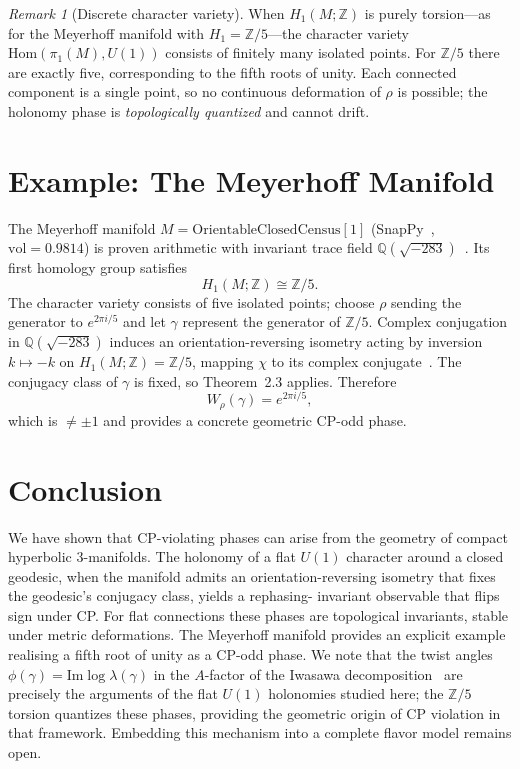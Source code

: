 \documentclass[12pt]{article}
\theoremstyle{remark}
\newtheorem{remark}[theorem]{Remark}
\theoremstyle{plain}
\begin{document}
\begin{remark}[Discrete character variety]
When $H_1(M;\mathbb{Z})$ is purely torsion---as for the Meyerhoff
manifold with $H_1=\mathbb{Z}/5$---the character variety
$\mathrm{Hom}(\pi_1(M),U(1))$ consists of finitely many isolated points.
For $\mathbb{Z}/5$ there are exactly five, corresponding to the fifth
roots of unity.  Each connected component is a single point, so no
continuous deformation of $\rho$ is possible; the holonomy phase is
\emph{topologically quantized} and cannot drift.
\end{remark}

\section{Example: The Meyerhoff Manifold}

The Meyerhoff manifold $M=\mathrm{OrientableClosedCensus}[1]$
(SnapPy~\cite{SnapPy}, $\mathrm{vol}=0.9814$) is proven arithmetic
with invariant trace field $\mathbb{Q}(\sqrt{-283})$~\cite{Chinburg98}.
Its first homology group satisfies
\[
H_1(M;\mathbb{Z}) \cong \mathbb{Z}/5.
\]
The character variety consists of five isolated points; choose $\rho$
sending the generator to $e^{2\pi i/5}$ and let $\gamma$ represent the
generator of $\mathbb{Z}/5$.
Complex conjugation in $\mathbb{Q}(\sqrt{-283})$ induces an
orientation-reversing isometry acting by inversion
$k\mapsto -k$ on $H_1(M;\mathbb{Z})=\mathbb{Z}/5$,
mapping $\chi$ to its complex conjugate~\cite{MaclachlanReid,Chinburg98}.
The conjugacy class of $\gamma$ is fixed, so Theorem~2.3 applies.
Therefore
\[
W_\rho(\gamma) = e^{2\pi i/5},
\]
which is $\neq \pm 1$ and provides a concrete geometric CP-odd phase.

\section{Conclusion}

We have shown that CP-violating phases can arise from the geometry of
compact hyperbolic $3$-manifolds.  The holonomy of a flat $U(1)$ character
around a closed geodesic, when the manifold admits an orientation-reversing
isometry that fixes the geodesic’s conjugacy class, yields a rephasing-
invariant observable that flips sign under CP.  For flat connections these
phases are topological invariants, stable under metric deformations.
The Meyerhoff manifold provides an explicit example realising a fifth
root of unity as a CP-odd phase.
We note that the twist angles $\phi(\gamma)=\mathrm{Im}\log\lambda(\gamma)$
in the $A$-factor of the Iwasawa decomposition~\cite{Gentry:CKM,Gentry:PMNS}
are precisely the arguments of the flat $U(1)$ holonomies studied here;
the $\mathbb{Z}/5$ torsion quantizes these phases, providing the geometric
origin of CP violation in that framework.
Embedding this mechanism into a complete flavor model remains open.
\end{document}

